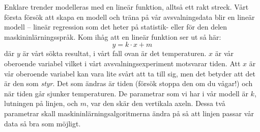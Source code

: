 \documentclass{article}
\begin{document}
Enklare trender modelleras med en lineär funktion, alltså ett rakt streck. Vårt första försök att skapa en modell och träna på vår avsvalningsdata blir en lineär modell – lineär regression som det heter på statistik- eller för den delen maskininlärningsspråk. Kom ihåg att en lineär funktion ser ut så här:
\[y = k \cdot x + m\]
där $y$  är vårt sökta resultat, i vårt fall ovan är det temperaturen. $x$ är vår oberoende variabel vilket i vårt avsvalningsexperiment motsvarar tiden. Att $x$ är vår oberoende variabel kan vara lite svårt att ta till sig, men det betyder att det är den som \emph{styr}. Det som ändras är tiden (försök stoppa den om du vågar!) och när tiden går sjunker temperaturen. De parametrar som vi har i vår modell är $k$, lutningen på linjen, och $m$, var den skär den vertikala axeln. Dessa två parametrar skall maskininlärningsalgoritmerna ändra på så att linjen passar vår data så bra som möjligt.
\end{document}

